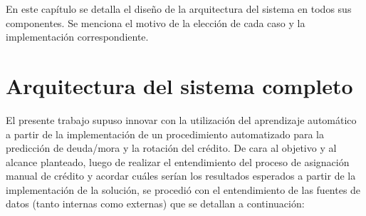 En este capítulo se detalla el diseño de la arquitectura del sistema en todos sus componentes. Se menciona el motivo de la elección de cada caso y la implementación correspondiente.

\section{Arquitectura del sistema completo} \label{sec:Arq}

El presente trabajo supuso innovar con la utilización del aprendizaje automático a partir de la implementación de un procedimiento automatizado para la predicción de deuda/mora y la
rotación del crédito. De cara al objetivo y al alcance planteado, luego de realizar el entendimiento del proceso de asignación manual de crédito y acordar cuáles serían los resultados esperados a partir de la implementación de la solución, se procedió con el entendimiento de las fuentes de datos (tanto internas como externas) que se detallan a continuación:
